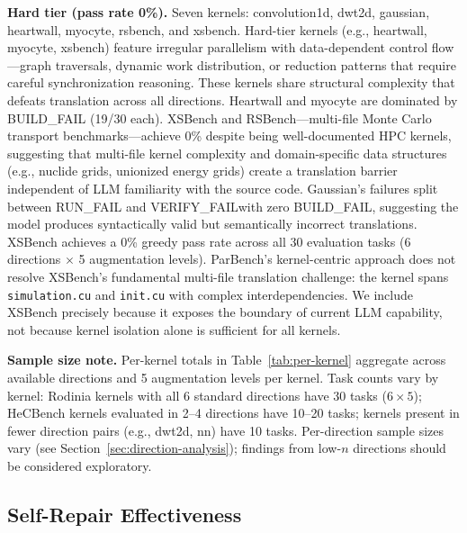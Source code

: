 \documentclass{article}
\newcommand{\buildfail}{\textsc{BUILD\_FAIL}}
\newcommand{\runfail}{\textsc{RUN\_FAIL}}
\newcommand{\verifyfail}{\textsc{VERIFY\_FAIL}}
\begin{document}
\textbf{Hard tier (pass rate 0\%).} Seven kernels: convolution1d, dwt2d, gaussian, heartwall, myocyte, rsbench, and xsbench.
Hard-tier kernels (e.g., heartwall, myocyte, xsbench) feature irregular
parallelism with data-dependent control flow---graph traversals,
dynamic work distribution, or reduction patterns that require
careful synchronization reasoning.
These kernels share structural complexity that defeats translation across all directions. Heartwall and myocyte are dominated by \buildfail{} (19/30 each). XSBench and RSBench---multi-file Monte Carlo transport benchmarks---achieve 0\% despite being well-documented HPC kernels, suggesting that multi-file kernel complexity and domain-specific data structures (e.g., nuclide grids, unionized energy grids) create a translation barrier independent of LLM familiarity with the source code. Gaussian's failures split between \runfail{} and \verifyfail with zero \buildfail{}, suggesting the model produces syntactically valid but semantically incorrect translations.
XSBench achieves a 0\% greedy pass rate across all 30 evaluation
tasks (6 directions $\times$ 5 augmentation levels).
ParBench's kernel-centric approach does not resolve XSBench's
fundamental multi-file translation challenge: the kernel spans
\texttt{simulation.cu} and \texttt{init.cu} with complex
interdependencies. We include XSBench precisely because it exposes
the boundary of current LLM capability, not because kernel isolation alone
is sufficient for all kernels.

\textbf{Sample size note.} Per-kernel totals in Table~\ref{tab:per-kernel} aggregate across available directions and 5 augmentation levels per kernel. Task counts vary by kernel: Rodinia kernels with all 6 standard directions have 30 tasks ($6 \times 5$); HeCBench kernels evaluated in 2--4 directions have 10--20 tasks; kernels present in fewer direction pairs (e.g., dwt2d, nn) have 10 tasks. Per-direction sample sizes vary (see Section~\ref{sec:direction-analysis}); findings from low-$n$ directions should be considered exploratory.

\subsection{Self-Repair Effectiveness}
\label{sec:self-repair}
\end{document}
